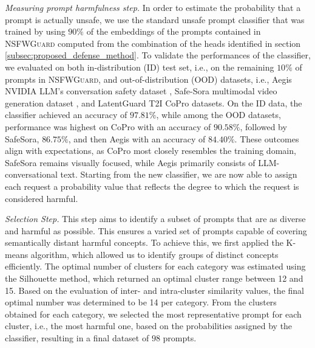 \documentclass[acmsmall]{acmart}
\newcommand{\datacentok}{\textsc{NSFWGuard}\xspace}
\begin{document}
{\textit{Measuring prompt harmfulness step.\label{subsub:classifierHead}}  
In order to estimate the probability that a prompt is actually unsafe, we use the standard unsafe prompt classifier that was trained by using $90\%$ of the embeddings of the prompts contained in \datacentok computed from the combination of the heads identified in section \ref{subsec:proposed_defense_method}. To validate the performances of the classifier, we evaluated on both in-distribution (ID) test set, i.e., on the remaining $10\%$ of prompts in \datacentok, and out-of-distribution (OOD) datasets, i.e., Aegis NVIDIA LLM's conversation safety dataset \cite{ghosh2025aegis2}, Safe-Sora multimodal video generation dataset \cite{dai2024safesora}, and LatentGuard T2I CoPro \cite{liu2024latent} datasets.  On the ID data, the classifier achieved an accuracy of $97.81\%$, while among the OOD datasets, performance was highest on CoPro with an accuracy of  $90.58\%$, followed by SafeSora,  $86.75\%$, and then Aegis with an accuracy of $84.40\%$. These outcomes align with expectations, as CoPro most closely resembles the training domain, SafeSora remains visually focused, while Aegis primarily consists of LLM-conversational text. Starting from the new classifier, we are now able to assign each request a probability value that reflects the degree to which the request is considered harmful.

\textit{Selection Step.} This step aims to identify a subset of prompts that are as diverse and harmful as possible. This ensures a varied set of prompts capable of covering semantically distant harmful concepts. To achieve this, we first applied the K-means algorithm, which allowed us to identify groups of distinct concepts efficiently. The optimal number of clusters for each category was estimated using the Silhouette method, which returned an optimal cluster range between 12 and 15. Based on the evaluation of inter- and intra-cluster similarity values, the final optimal number was determined to be 14 per category.
From the clusters obtained for each category, we selected the most representative prompt for each cluster, i.e., the most harmful one, based on the probabilities assigned by the classifier, resulting in a final dataset of $98$ prompts. 

}
\end{document}
